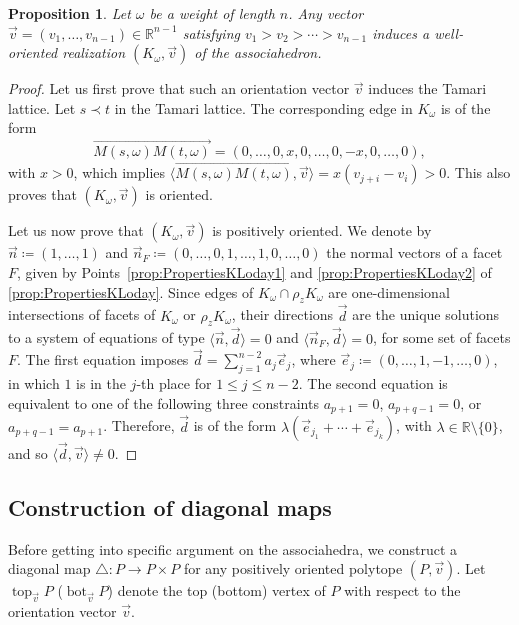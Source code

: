 \documentclass[JEP,XML,SOM,Unicode,NoFloatCountersInSection]{cedram}
\theoremstyle{plain}
\newtheorem{proposition}{Proposition}
\theoremstyle{definition}
\newcommand{\RR}{\mathbb{R}}
\newcommand{\K}{{K}}
\DeclareMathOperator{\tp}{top}
\DeclareMathOperator{\bm}{bot}
\newcommand{\ang}[1]{\langle #1\rangle}
\begin{document}
\begin{proposition}\label{prop:OrientationVector}
Let $\omega$ be a weight of length $n$.
Any vector $\vec v=(v_1, \ldots, v_{n-1})\in \RR^{n-1}$ satisfying $v_1>v_2>\cdots >v_{n-1}$ induces a
well-oriented realization $(\K_\omega, \vec v)$ of the associahedron.
\end{proposition}

\begin{proof}
Let us first prove that such an orientation vector $\vec v$ induces the Tamari lattice.
Let $s\prec t$ in the Tamari lattice. The corresponding edge in $\K_\omega$ is of the form
\[\overrightarrow{M(s,\omega)M(t,\omega)}=(0, \ldots, 0, x, 0, \ldots, 0, -x, 0, \ldots, 0), \]
with $x>0$, which implies
$\big\langle\overrightarrow{M(s,\omega)M(t,\omega)}, \vec v\big\rangle= x(v_{j+i}-v_i)>0$.
This also proves that $(K_\omega,\vec v)$ is oriented.

Let us now prove that $(\K_\omega,\vec v)$ is positively oriented.
We denote by $\vec n\coloneqq (1, \ldots, 1)$ and $\vec n_F\coloneqq (0, \ldots, 0,\allowbreak {1}, \ldots, {1}, 0, \ldots, 0)$ the normal vectors of a facet $F$, given by Points~\eqref{prop:PropertiesKLoday1} and \eqref{prop:PropertiesKLoday2} of \cref{prop:PropertiesKLoday}.
Since edges of $\K_\omega\cap \rho_z \K_\omega$
are one-dimensional intersections of facets of
$\K_\omega$ or $\rho_z \K_\omega$, their directions $\vec d$ are the unique solutions to a system of equations of type $\langle \vec n, \vec d\rangle=0$ and $\langle \vec n_F, \vec d\rangle=0$, for some set of facets $F$.
The first equation imposes $\vec d=\sum_{j=1}^{n-2} a_j \vec e_j$, where
$\vec e_j\coloneqq (0, \ldots, 1, -1, \ldots, 0)$, in which $1$ is in the $j$-th place for $1\leq j\leq n-2$.
The second equation is equivalent to one of the following three constraints
$a_{p+1}=0$, $a_{p+q-1}=0$, or $a_{p+q-1}=a_{p+1}$.
Therefore, $\vec d$ is of the form $\lambda\left(\vec e_{j_1}+\cdots +\vec e_{j_k}\right)$, with $\lambda \in \RR\setminus \{0\}$, and so
$\ang{\vec d, \vec v}\neq 0$.
\end{proof}

\subsection{Construction of diagonal maps}

Before getting into specific argument on the associahedra, we construct a diagonal map $\triangle: P\to P\times P$ for any positively oriented polytope $(P, \vec v)$. Let $\tp_{\vec v} P$ (\resp $\bm_{\vec v} P$) denote the top (\resp bottom) vertex of $P$ with respect to the orientation vector $\vec v$.
\end{document}
